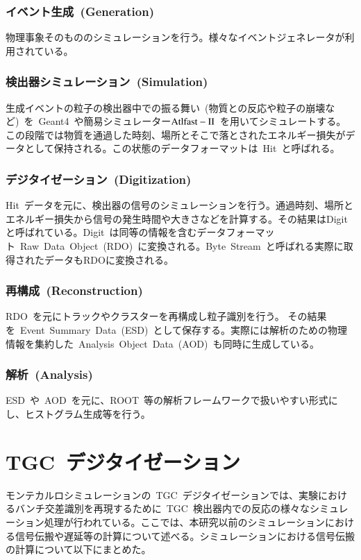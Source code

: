 \subsubsection{イベント生成~(Generation)~}
物理事象そのもののシミュレーションを行う。様々なイベントジェネレータが利用されている。

\subsubsection{検出器シミュレーション~(Simulation)~}
生成イベントの粒子の検出器中での振る舞い~(物質との反応や粒子の崩壊など)~を~Geant4~\cite{URL:22}や簡易シミュレーター$\rm{Atlfast-II}$~\cite{TR:08}を用いてシミュレートする。この段階では物質を通過した時刻、場所とそこで落とされたエネルギー損失がデータとして保持される。この状態のデータフォーマットは~Hit~と呼ばれる。

\subsubsection{デジタイゼーション~(Digitization)~}
Hit~データを元に、検出器の信号のシミュレーションを行う。通過時刻、場所とエネルギー損失から信号の発生時間や大きさなどを計算する。その結果はDigitと呼ばれている。Digit~は同等の情報を含むデータフォーマット~Raw~Data~Object~(RDO)~に変換される。Byte~Stream~と呼ばれる実際に取得されたデータもRDOに変換される。

\subsubsection{再構成~(Reconstruction)~}
RDO~を元にトラックやクラスターを再構成し粒子識別を行う。
その結果を~Event~Summary~Data~(ESD)~として保存する。実際には解析のための物理情報を集約した~Analysis~Object~Data~(AOD)~も同時に生成している。

\subsubsection{解析~(Analysis)~}
ESD~や~AOD~を元に、ROOT~\cite{URL:23}等の解析フレームワークで扱いやすい形式にし、ヒストグラム生成等を行う。

\section{TGC~デジタイゼーション}
モンテカルロシミュレーションの~TGC~デジタイゼーションでは、実験におけるバンチ交差識別を再現するために~TGC~検出器内での反応の様々なシミュレーション処理が行われている。ここでは、本研究以前のシミュレーションにおける信号伝搬や遅延等の計算について述べる。シミュレーションにおける信号伝搬の計算について以下にまとめた。

